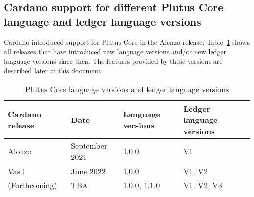 \subsection{Cardano support for different Plutus Core language and ledger language versions}

Cardano introduced support for Plutus Core in the Alonzo release;
Table~\ref{table:versions} shows all releases that have introduced new language
versions and/or new ledger language versions since then.  The features provided
by these versions are described later in this document.
 
\begin{table}[H]
  \centering
    \begin{tabular}{|l|l|l|l|}
        \hline
        Cardano release & Date & Language versions & Ledger language versions \\
        \hline
        Alonzo & September 2021 & 1.0.0 & V1 \\
        Vasil & June 2022 & 1.0.0 & V1, V2 \\
        (Forthcoming) & TBA & 1.0.0, 1.1.0 & V1, V2, V3 \\
        \hline
    \end{tabular}
    \caption{Plutus Core language versions and ledger language versions}
    \label{table:versions}
\end{table}
   


